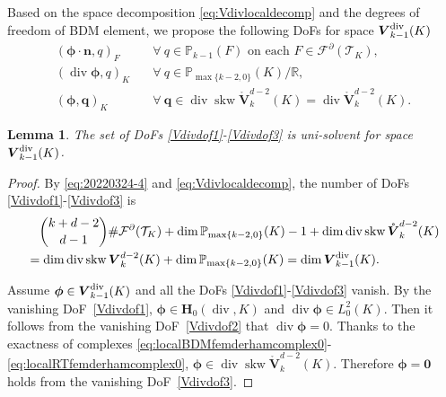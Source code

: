 \documentclass[10pt]{amsart}
\newtheorem{lemma}[theorem]{Lemma}
\newcommand{\bs}{\boldsymbol}
\renewcommand{\div}{\operatorname{div}}
\newcommand{\skw}{\operatorname{skw}}
\numberwithin{equation}{section}
\begin{document}
Based on the space decomposition \eqref{eq:Vdivlocaldecomp} and the degrees of freedom of BDM element, we propose the following DoFs for space $\boldsymbol{V}_{k-1}^{\rm div}(K)$
\begin{align}
    (\boldsymbol{\phi}\cdot\boldsymbol{n}, q)_F & \quad\forall~q\in\mathbb P_{k-1}(F) \textrm{ on each }  F\in\mathcal F^{\partial}(\mathcal T_K), \label{Vdivdof1}\\
    (\div\boldsymbol{\phi}, q)_K & \quad\forall~q\in\mathbb P_{\max\{k-2,0\}}(K)/\mathbb R, \label{Vdivdof2} \\
    (\boldsymbol{\phi}, \bs q)_K & \quad\forall~\bs q\in \div\skw\mathring{\boldsymbol{V}}_{k}^{d-2}(K)=\div\mathring{\boldsymbol{V}}_{k}^{d-2}(K). \label{Vdivdof3}
\end{align}
\begin{lemma}
The set of DoFs \eqref{Vdivdof1}-\eqref{Vdivdof3} is uni-solvent for space $\boldsymbol{V}_{k-1}^{\rm div}(K)$.
\end{lemma}
\begin{proof}
By \eqref{eq:20220324-4} and \eqref{eq:Vdivlocaldecomp},
the number of DoFs \eqref{Vdivdof1}-\eqref{Vdivdof3} is
\begin{align*}
&\quad {k+d-2\choose d-1}\#\mathcal F^{\partial}(\mathcal T_K)+\dim\mathbb P_{\max\{k-2,0\}}(K)-1+\dim\div\skw\mathring{\boldsymbol{V}}_{k}^{d-2}(K) \\
&=\dim\div\skw\boldsymbol{V}_{k}^{d-2}(K)+\dim\mathbb P_{\max\{k-2,0\}}(K)=\dim\boldsymbol{V}_{k-1}^{\rm div}(K).
\end{align*}

Assume $\boldsymbol{\phi}\in\boldsymbol{V}_{k-1}^{\rm div}(K)$ and all the DoFs \eqref{Vdivdof1}-\eqref{Vdivdof3} vanish. By the vanishing DoF~\eqref{Vdivdof1}, $\boldsymbol{\phi}\in \boldsymbol{H}_0(\div, K)$ and $\div\boldsymbol{\phi}\in L_0^2(K)$. Then it follows from the vanishing DoF~\eqref{Vdivdof2} that $\div\boldsymbol{\phi}=0$. 
Thanks to the exactness of complexes \eqref{eq:localBDMfemderhamcomplex0}-\eqref{eq:localRTfemderhamcomplex0}, $\boldsymbol{\phi}\in\div\skw\mathring{\boldsymbol{V}}_{k}^{d-2}(K)$. Therefore $\boldsymbol{\phi}=\boldsymbol{0}$ holds from the vanishing DoF~\eqref{Vdivdof3}.
\end{proof}
\end{document}
